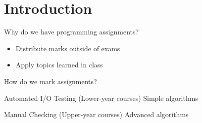 
\section{Introduction}

\begin{frame}{Why do we have programming assignments?}
\begin{itemize}
\item Distribute marks outside of exams
\item Apply topics learned in class
\end{itemize}
\end{frame}



\begin{frame}{How do we mark assignments?}
\begin{block}{Automated I/O Testing (Lower-year courses)}
Simple algorithms
\end{block}
\begin{block}{Manual Checking (Upper-year courses)}
Advanced algorithms
\end{block}
\end{frame}

